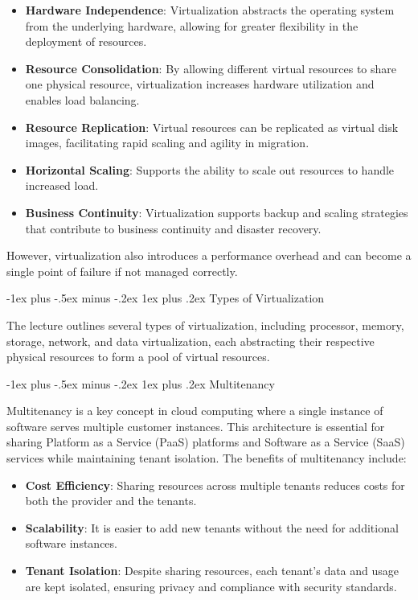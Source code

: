 \documentclass[10pt, landscape]{article}
\makeatletter
\renewcommand{\subsubsection}{\@startsection{subsubsection}{3}{0mm}%
  {-1ex plus -.5ex minus -.2ex}%
  {1ex plus .2ex}%
{\normalfont\small\bfseries}}%
\makeatother
\begin{document}
\begin{multicols*}{4}
\begin{itemize}
\tightlist
\item
  \textbf{Hardware Independence}: Virtualization abstracts the operating
  system from the underlying hardware, allowing for greater flexibility
  in the deployment of resources.
\item
  \textbf{Resource Consolidation}: By allowing different virtual
  resources to share one physical resource, virtualization increases
  hardware utilization and enables load balancing.
\item
  \textbf{Resource Replication}: Virtual resources can be replicated as
  virtual disk images, facilitating rapid scaling and agility in
  migration.
\item
  \textbf{Horizontal Scaling}: Supports the ability to scale out
  resources to handle increased load.
\item
  \textbf{Business Continuity}: Virtualization supports backup and
  scaling strategies that contribute to business continuity and disaster
  recovery.
\end{itemize}

However, virtualization also introduces a performance overhead and can
become a single point of failure if not managed correctly.

\subsubsection{Types of Virtualization}\label{types-of-virtualization}

The lecture outlines several types of virtualization, including
processor, memory, storage, network, and data virtualization, each
abstracting their respective physical resources to form a pool of
virtual resources.

\subsubsection{Multitenancy}\label{multitenancy}

Multitenancy is a key concept in cloud computing where a single instance
of software serves multiple customer instances. This architecture is
essential for sharing Platform as a Service (PaaS) platforms and
Software as a Service (SaaS) services while maintaining tenant
isolation. The benefits of multitenancy include:

\begin{itemize}
\tightlist
\item
  \textbf{Cost Efficiency}: Sharing resources across multiple tenants
  reduces costs for both the provider and the tenants.
\item
  \textbf{Scalability}: It is easier to add new tenants without the need
  for additional software instances.
\item
  \textbf{Tenant Isolation}: Despite sharing resources, each tenant's
  data and usage are kept isolated, ensuring privacy and compliance with
  security standards.
\end{itemize}


\end{multicols*}
\end{document}
